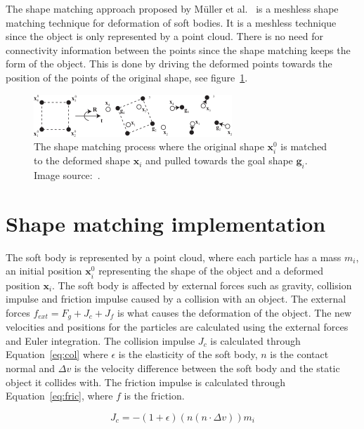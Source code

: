     The shape matching approach proposed by M\"uller et al.~\cite{shapematching} is a meshless shape matching technique for deformation of soft bodies.
    It is a meshless technique since the object is only represented by a point cloud.
    There is no need for connectivity information between the points since the shape matching keeps the form of the object.
    This is done by driving the deformed points towards the position of the points of the original shape, see figure~\ref{fig:def}.
    
    \begin{figure}
    \includegraphics[width=\linewidth]{img/deformation2.png}
    \caption{The shape matching process where the original shape $\mathbf{x}^0_i$ is matched to the deformed shape $\mathbf{x}_i$ and pulled towards the goal shape $\mathbf{g}_i$. Image source:~\cite{shapematching}.}
    \label{fig:def}
    \end{figure}
    
\section{Shape matching implementation}
    The soft body is represented by a point cloud, where each particle has a mass $m_i$, an initial position $\mathbf{x}_i^0$ representing the shape of the object and a deformed position $\mathbf{x}_i$.
    The soft body is affected by external forces such as gravity, collision impulse and friction impulse caused by a collision with an object.
    The external forces $f_{ext} = F_g + J_c + J_f$ is what causes the deformation of the object.
    The new velocities and positions for the particles are calculated using the external forces and Euler integration.
    The collision impulse $J_c$ is calculated through Equation~\ref{eq:col} where $\epsilon$ is the elasticity of the soft body, $n$ is the contact normal and $\Delta{v}$ is the velocity difference between the soft body and the static object it collides with.
    The friction impulse is calculated through Equation~\ref{eq:fric}, where $f$ is the friction.

    \begin{equation} \label{eq:col}
        J_c = -(1 + \epsilon)(n(n\cdot{\Delta{v}}))m_i
    \end{equation}


